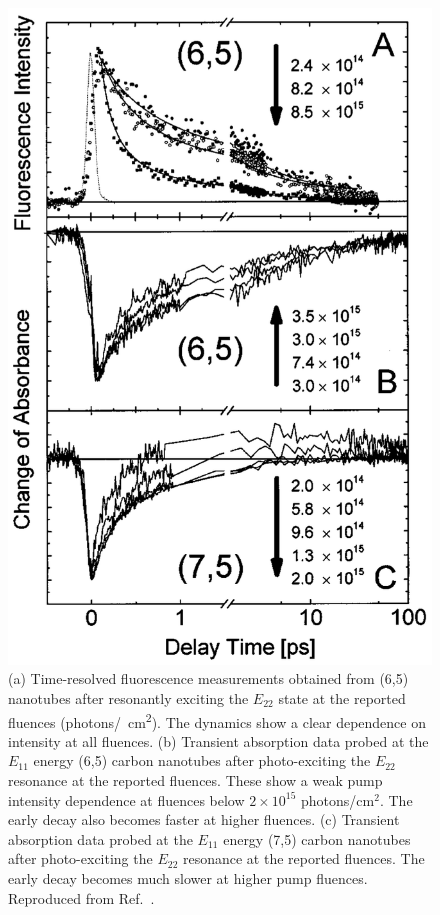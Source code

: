 \begin{figure}[H]
	\centering
	\includegraphics[scale=0.3]{images/chapter_prior_works/fluorescence_abs_2_ma_2004}
	\caption{(a) Time-resolved fluorescence measurements  obtained from (6,5) nanotubes after resonantly exciting the $E_{22}$ state at the reported fluences (photons\si{/\cm \squared}). The dynamics show a clear dependence on intensity at all fluences. (b) Transient absorption data probed at the $E_{11}$ energy (6,5) carbon nanotubes after photo-exciting the $E_{22}$ resonance at the reported fluences. These show a weak pump intensity dependence at fluences below $2 \times 10^{15}$ photons/cm$^2$. The early decay also becomes faster at higher fluences. (c) Transient absorption data probed at the $E_{11}$ energy (7,5) carbon nanotubes after photo-exciting the $E_{22}$ resonance at the reported fluences. The early decay becomes much slower at higher pump fluences. Reproduced from Ref.\ \cite{ma2004ultrafast}.}
	\label{fig:fluorescence_abs_ma_2004}
\end{figure}

